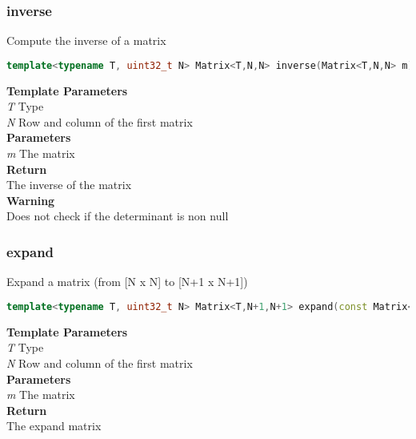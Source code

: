 \subsubsection{inverse}
\begin{mdframed}
Compute the inverse of a matrix
\begin{lstlisting}[language=C++]
template<typename T, uint32_t N> Matrix<T,N,N> inverse(Matrix<T,N,N> m) 
\end{lstlisting}
\textbf{Template Parameters} \\ 
\textit{T} Type \\ 
\textit{N} Row and column of the first matrix \\ 
\textbf{Parameters} \\ 
\textit{m} The matrix \\ 
\textbf{Return} \\ 
The inverse of the matrix\\ 
\textbf{Warning} \\ 
Does not check if the determinant is non null\\ 
\end{mdframed}

\subsubsection{expand}
\begin{mdframed}
Expand a matrix (from [N x N] to [N+1 x N+1])
\begin{lstlisting}[language=C++]
template<typename T, uint32_t N> Matrix<T,N+1,N+1> expand(const Matrix<T,N,N>& m) 
\end{lstlisting}
\textbf{Template Parameters} \\ 
\textit{T} Type \\ 
\textit{N} Row and column of the first matrix \\ 
\textbf{Parameters} \\ 
\textit{m} The matrix \\ 
\textbf{Return} \\ 
The expand matrix\\ 
\end{mdframed}

